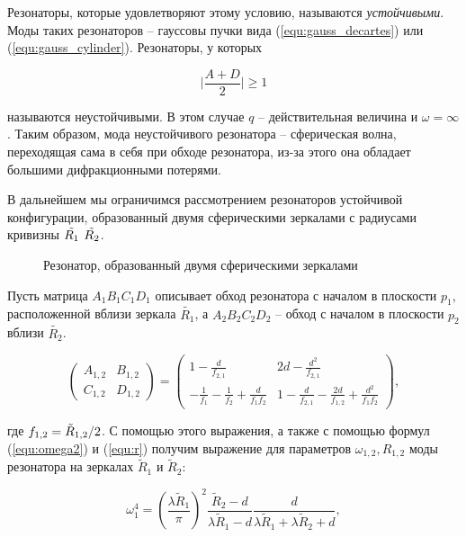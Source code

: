 \documentclass[a4paper,12pt]{article}
\begin{document}
Резонаторы, которые удовлетворяют этому условию, называются \textit{устойчивыми}. Моды таких резонаторов -- гауссовы пучки вида (\ref{equ:gauss_decartes}) или (\ref{equ:gauss_cylinder}). Резонаторы, у которых

\begin{equation}
    \Bigr|\frac{A + D}{2}\Bigr| \geq 1
\end{equation}

называются неустойчивыми. В этом случае $q$ -- действительная величина и $\omega = \infty$. Таким образом, мода неустойчивого резонатора -- сферическая волна, переходящая сама в себя при обходе резонатора, из-за этого она обладает большими дифракционными потерями.

В дальнейшем мы ограничимся рассмотрением резонаторов устойчивой конфигурации, образованный двумя сферическими зеркалами с радиусами кривизны $\Tilde{R_1}$ $\Tilde{R_2}$. 

\begin{figure}[h!]
    \caption{Резонатор, образованный двумя сферическими зеркалами}
    \label{fig:2_mirrors}
\end{figure}

Пусть матрица $A_1 B_1 C_1 D_1$ описывает обход резонатора с началом в плоскости $p_1$, расположенной вблизи зеркала $\tilde{R_1}$, а $A_2 B_2 C_2 D_2$ -- обход с началом в плоскости $p_2$ вблизи $\tilde{R_2}$.

\begin{equation}
    \begin{pmatrix}
        A_{1,2} & B_{1,2}\\
        C_{1,2} & D_{1,2}
    \end{pmatrix}
    =
    \begin{pmatrix}
        1 - \frac{d}{f_{2,1}} & 2d - \frac{d^2}{f_{2,1}}\\
        -\frac{1}{f_1} - \frac{1}{f_2} + \frac{d}{f_1 f_2} & 1 - \frac{d}{f_{2,1}} - \frac{2d}{f_{1,2}} + \frac{d^2}{f_1 f_2}
    \end{pmatrix},
\end{equation}

где $f_{1,2} = \Tilde{R}_{1,2}/2$. С помощью этого выражения, а также с помощью формул (\ref{equ:omega2}) и (\ref{equ:r}) получим выражение для параметров $\omega_{1,2}, R_{1,2}$ моды резонатора на зеркалах $\tilde{R}_1$ и $\tilde{R}_2$:

\begin{equation}
    \omega_1^4 = (\frac{\lambda \tilde{R}_1}{\pi})^2 \frac{\tilde{R}_2 - d}{\lambda\tilde{R}_1 - d}\frac{d}{\lambda\tilde{R}_1 + \lambda\tilde{R}_2 + d},
\end{equation}
\end{document}

